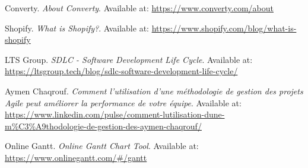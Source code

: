 \begin{thebibliography}{99}
    Converty. \textit{About Converty}. Available at: \url{https://www.converty.com/about}

    Shopify. \textit{What is Shopify?}. Available at: \url{https://www.shopify.com/blog/what-is-shopify}

    LTS Group. \textit{SDLC - Software Development Life Cycle}. Available at: \url{https://ltsgroup.tech/blog/sdlc-software-development-life-cycle/}

    Aymen Chaqrouf. \textit{Comment l'utilisation d'une méthodologie de gestion des projets Agile peut améliorer la performance de votre équipe}. Available at: \url{https://www.linkedin.com/pulse/comment-lutilisation-dune-m%C3%A9thodologie-de-gestion-des-aymen-chaqrouf/}

    Online Gantt. \textit{Online Gantt Chart Tool}. Available at: \url{https://www.onlinegantt.com/#/gantt}

\end{thebibliography}